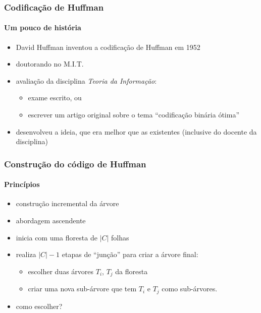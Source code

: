 \documentclass{beamer}
\begin{document}

\begin{frame}
\frametitle{Codificação de Huffman}
\framesubtitle{Um pouco de história}

\begin{itemize}
\item David Huffman inventou a codificação de Huffman em 1952
\item doutorando no M.I.T.
\item avaliação da disciplina \emph{Teoria da Informação}: 
\begin{itemize}
\item exame escrito, ou
\item escrever um artigo original sobre o tema ``codificação binária ótima''
\end{itemize}
\item desenvolveu a ideia, que era melhor que as existentes (inclusive do
  docente da disciplina)
\end{itemize}
\end{frame}


\begin{frame}
\frametitle{Construção do código de Huffman}
\framesubtitle{Princípios}
\begin{itemize}
\item construção incremental da árvore
\item abordagem ascendente
\item inicia com uma floresta de $|C|$ folhas
\item realiza $|C|-1$ etapas de ``junção'' para criar a árvore final:
\begin{itemize}
\item \alert<2>{escolher} duas árvores $T_i$, $T_j$ da floresta
\item criar uma nova sub-árvore que tem $T_i$ e $T_j$ como sub-árvores.
\end{itemize}
\pause
\item \alert{como escolher?}
\end{itemize}
\end{frame}

\end{document}
